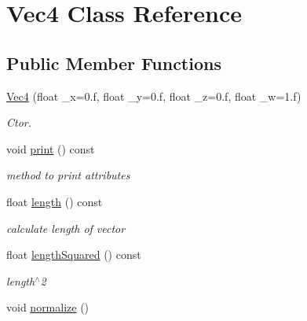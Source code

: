 \hypertarget{classVec4}{\section{Vec4 Class Reference}
\label{classVec4}
}
\subsection*{Public Member Functions}
\begin{DoxyCompactItemize}
\item 
\hyperlink{classVec4_a344fcd31f117d1380c42276615aee7ca}{Vec4} (float \-\_\-x=0.f, float \-\_\-y=0.f, float \-\_\-z=0.f, float \-\_\-w=1.f)
\begin{DoxyCompactList}\small\item\em Ctor. \end{DoxyCompactList}\item 
\hypertarget{classVec4_ad64cc540a46a7b1795aa20c59e9d9610}{void \hyperlink{classVec4_ad64cc540a46a7b1795aa20c59e9d9610}{print} () const }\label{classVec4_ad64cc540a46a7b1795aa20c59e9d9610}

\begin{DoxyCompactList}\small\item\em method to print attributes \end{DoxyCompactList}\item 
\hypertarget{classVec4_a08573e03357a6d14294da98c46cbab58}{float \hyperlink{classVec4_a08573e03357a6d14294da98c46cbab58}{length} () const }\label{classVec4_a08573e03357a6d14294da98c46cbab58}

\begin{DoxyCompactList}\small\item\em calculate length of vector \end{DoxyCompactList}\item 
\hypertarget{classVec4_ae2413a4eb232a55f15bafa13e49e75b7}{float \hyperlink{classVec4_ae2413a4eb232a55f15bafa13e49e75b7}{length\-Squared} () const }\label{classVec4_ae2413a4eb232a55f15bafa13e49e75b7}

\begin{DoxyCompactList}\small\item\em length$^\wedge$2 \end{DoxyCompactList}\item 
\hypertarget{classVec4_aecf9d5a3003c2a443098b4d80bc9dea6}{void \hyperlink{classVec4_aecf9d5a3003c2a443098b4d80bc9dea6}{normalize} ()}\label{classVec4_aecf9d5a3003c2a443098b4d80bc9dea6}


\end{DoxyCompactItemize}
